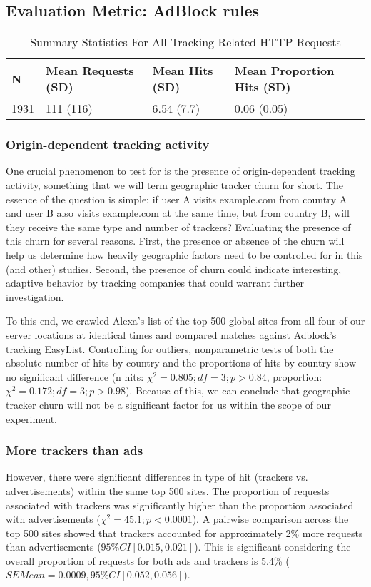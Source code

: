 \documentclass[conference]{IEEEtran}
\begin{document}
\subsection{Evaluation Metric: AdBlock rules}

\begin{table*}[t]
\centering
\caption{Summary Statistics For All Tracking-Related HTTP Requests}
\label{summaryTracking}
\begin{tabular}{|l|l|l|l|}
\hline
\textbf{N} & \textbf{Mean Requests (SD)} & \textbf{Mean Hits (SD)} & \textbf{Mean Proportion Hits (SD)} \\ \hline
1931       & 111 (116)                   & 6.54 (7.7)              & 0.06 (0.05)                        \\ \hline
\end{tabular}
\end{table*}


\subsubsection{Origin-dependent tracking activity }

One crucial phenomenon to test for is the presence of origin-dependent tracking activity, something that we will term geographic tracker churn for short. The essence of the question is simple: if user A visits example.com from country A and user B also visits example.com at the same time, but from country B, will they receive the same type and number of trackers? Evaluating the presence of this churn for several reasons. First, the presence or absence of the churn will help us determine how heavily geographic factors need to be controlled for in this (and other) studies. Second, the presence of churn could indicate interesting, adaptive behavior by tracking companies that could warrant further investigation.

To this end, we crawled Alexa's list of the top 500 global sites from all four of our server locations at identical times and compared matches against Adblock's tracking EasyList. Controlling for outliers, nonparametric tests of both the absolute number of hits by country and the proportions of hits by country show no significant difference (n hits: $\chi^{2}=0.805; df=3; p>0.84$, proportion: $\chi^{2}=0.172; df=3; p>0.98$). Because of this, we can conclude that geographic tracker churn will not be a significant factor for us within the scope of our experiment.

\subsubsection{More trackers than ads}
However, there were significant differences in type of hit (trackers vs. advertisements) within the same top 500 sites. The proportion of requests associated with trackers was significantly higher than the proportion associated with advertisements ($\chi^{2}=45.1; p<0.0001$). A pairwise comparison across the top 500 sites showed that trackers accounted for approximately 2\% more requests than advertisements ($95\% CI [0.015, 0.021]$). This is significant considering the overall proportion of requests for both ads and trackers is 5.4\% ($SEMean = 0.0009, 95\% CI [0.052, 0.056]$).
\end{document}
